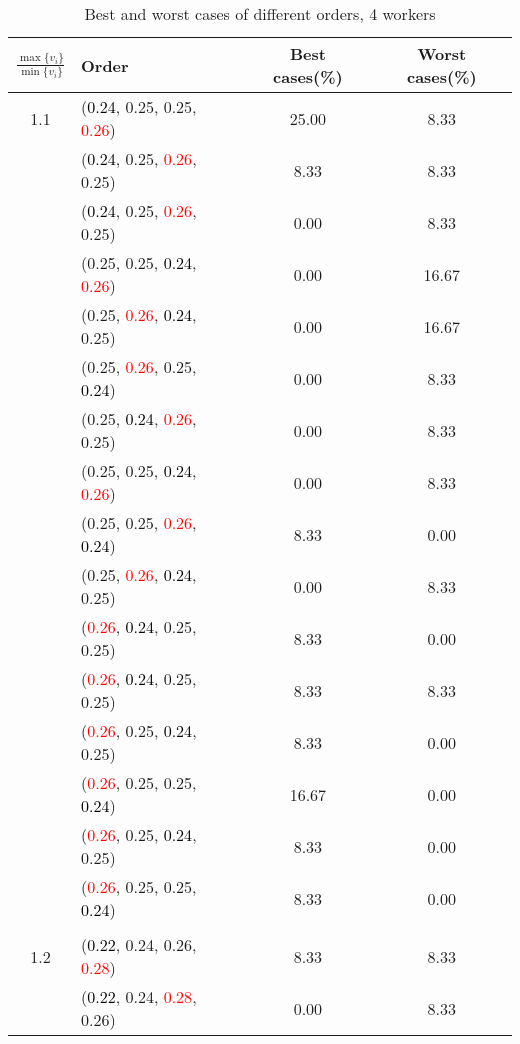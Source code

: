 \documentclass[10pt,a4paper]{report}
\begin{document}
\newpage\begin{center}
	\small
	\begin{longtable}{clcc}
		\caption{Best and worst cases of different orders, 4 workers}\\
		\toprule
		\setlength{\tabcolsep}{1mm}
		\renewcommand\baselinestretch{0.5}\selectfont
		$\frac{\max\{v_i\}}{\min\{v_i\}}$ & Order & Best cases(\%) & Worst cases(\%) \\
			\midrule		1.1			&(\textcolor{black}{0.24}, 0.25, 0.25, \textcolor{red}{0.26})&25.00&8.33\\
			&(\textcolor{black}{0.24}, 0.25, \textcolor{red}{0.26}, 0.25)&8.33&8.33\\
			&(\textcolor{black}{0.24}, 0.25, \textcolor{red}{0.26}, 0.25)&0.00&8.33\\
			&(0.25, 0.25, \textcolor{black}{0.24}, \textcolor{red}{0.26})&0.00&16.67\\
			&(0.25, \textcolor{red}{0.26}, \textcolor{black}{0.24}, 0.25)&0.00&16.67\\
			&(0.25, \textcolor{red}{0.26}, 0.25, \textcolor{black}{0.24})&0.00&8.33\\
			&(0.25, \textcolor{black}{0.24}, \textcolor{red}{0.26}, 0.25)&0.00&8.33\\
			&(0.25, 0.25, \textcolor{black}{0.24}, \textcolor{red}{0.26})&0.00&8.33\\
			&(0.25, 0.25, \textcolor{red}{0.26}, \textcolor{black}{0.24})&8.33&0.00\\
			&(0.25, \textcolor{red}{0.26}, \textcolor{black}{0.24}, 0.25)&0.00&8.33\\
			&(\textcolor{red}{0.26}, \textcolor{black}{0.24}, 0.25, 0.25)&8.33&0.00\\
			&(\textcolor{red}{0.26}, \textcolor{black}{0.24}, 0.25, 0.25)&8.33&8.33\\
			&(\textcolor{red}{0.26}, 0.25, \textcolor{black}{0.24}, 0.25)&8.33&0.00\\
			&(\textcolor{red}{0.26}, 0.25, 0.25, \textcolor{black}{0.24})&16.67&0.00\\
			&(\textcolor{red}{0.26}, 0.25, \textcolor{black}{0.24}, 0.25)&8.33&0.00\\
			&(\textcolor{red}{0.26}, 0.25, 0.25, \textcolor{black}{0.24})&8.33&0.00\\
		&&&\\
		1.2			&(\textcolor{black}{0.22}, 0.24, 0.26, \textcolor{red}{0.28})&8.33&8.33\\
			&(\textcolor{black}{0.22}, 0.24, \textcolor{red}{0.28}, 0.26)&0.00&8.33\\

\end{longtable}
\end{center}
\end{document}
